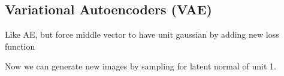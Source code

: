 
\subsection{Variational Autoencoders (VAE)}

Like AE, but force middle vector to have unit gaussian by adding new loss function

Now we can generate new images by sampling for latent normal of unit 1.
